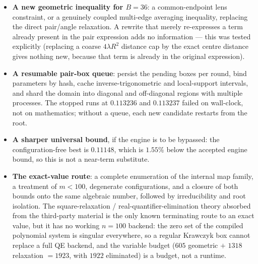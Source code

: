 \begin{itemize}[leftmargin=1.4em,itemsep=3pt]
\item \textbf{A new geometric inequality for $B=36$}: a common-endpoint lens constraint, or a
genuinely coupled multi-edge averaging inequality, replacing the direct pair/angle relaxation. A
rewrite that merely re-expresses a term already present in the pair expression adds no information
--- this was tested explicitly (replacing a coarse $4\lambda R^2$ distance cap by the exact centre
distance gives nothing new, because that term is already in the original expression).
\item \textbf{A resumable pair-box queue}: persist the pending boxes per round, bind parameters by
hash, cache inverse-trigonometric and local-support intervals, and shard the domain into diagonal and
off-diagonal regions with multiple processes. The stopped runs at $0.113236$ and $0.113237$ failed on
wall-clock, not on mathematics; without a queue, each new candidate restarts from the root.
\item \textbf{A sharper universal bound}, if the engine is to be bypassed: the configuration-free
best is $0.11148$, which is $1.55\%$ below the accepted engine bound, so this is not a near-term
substitute.
\item \textbf{The exact-value route}: a complete enumeration of the internal map family, a treatment
of $m<100$, degenerate configurations, and a closure of both bounds onto the same algebraic number,
followed by irreducibility and root isolation. The square-relaxation / real-quantifier-elimination
theory absorbed from the third-party material is the only known terminating route to an exact value,
but it has no working $n=100$ backend: the zero set of the compiled polynomial system is singular
everywhere, so a regular Krawczyk box cannot replace a full QE backend, and the variable budget
($605$ geometric $+$ $1318$ relaxation $=1923$, with $1922$ eliminated) is a budget, not a runtime.
\end{itemize}
